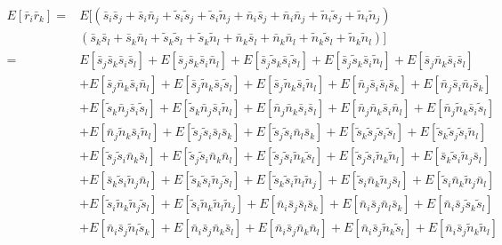 \begin{equation}
  \begin{split}
    E[\bar{r}_i\bar{r}_k] = &E[(\bar{s}_i\bar{s}_j + \bar{s}_i\bar{n}_j +\tilde{s}_i\tilde{s}_j+\tilde{s}_i\tilde{n}_j + \bar{n}_i\bar{s}_j+\bar{n}_i\bar{n}_j+\tilde{n}_i\tilde{s}_j+\tilde{n}_i\tilde{n}_j)\\
    &(\bar{s}_k\bar{s}_l + \bar{s}_k\bar{n}_l +\tilde{s}_k\tilde{s}_l+\tilde{s}_k\tilde{n}_l + \bar{n}_k\bar{s}_l+\bar{n}_k\bar{n}_l+\tilde{n}_k\tilde{s}_l+\tilde{n}_k\tilde{n}_l)]\\
    = &E[\bar{s}_j\bar{s}_k\bar{s}_i\bar{s}_l]+E[\bar{s}_j\bar{s}_k\bar{s}_i\bar{n}_l]+E[\bar{s}_j\tilde{s}_k\bar{s}_i\tilde{s}_l]+E[\bar{s}_j\tilde{s}_k\bar{s}_i\tilde{n}_l]+E[\bar{s}_j\bar{n}_k\bar{s}_i\bar{s}_l]\\
&+E[\bar{s}_j\bar{n}_k\bar{s}_i\bar{n}_l]+E[\bar{s}_j\tilde{n}_k\bar{s}_i\tilde{s}_l]+E[\bar{s}_j\tilde{n}_k\bar{s}_i\tilde{n}_l]+E[\bar{n}_j\bar{s}_i\bar{s}_l\bar{s}_k]+E[\bar{n}_j\bar{s}_i\bar{n}_l\bar{s}_k]\\
&+E[\tilde{s}_k\bar{n}_j\bar{s}_i\tilde{s}_l]+E[\tilde{s}_k\bar{n}_j\bar{s}_i\tilde{n}_l]+E[\bar{n}_j\bar{n}_k\bar{s}_i\bar{s}_l]+E[\bar{n}_j\bar{n}_k\bar{s}_i\bar{n}_l]+E[\bar{n}_j\tilde{n}_k\bar{s}_i\tilde{s}_l]\\
&+E[\bar{n}_j\tilde{n}_k\bar{s}_i\tilde{n}_l]+E[\tilde{s}_j\tilde{s}_i\bar{s}_l\bar{s}_k]+E[\tilde{s}_j\tilde{s}_i\bar{n}_l\bar{s}_k]+E[\tilde{s}_k\tilde{s}_j\tilde{s}_i\tilde{s}_l]+E[\tilde{s}_k\tilde{s}_j\tilde{s}_i\tilde{n}_l]\\
&+E[\tilde{s}_j\tilde{s}_i\bar{n}_k\bar{s}_l]+E[\tilde{s}_j\tilde{s}_i\bar{n}_k\bar{n}_l]+E[\tilde{s}_j\tilde{s}_i\tilde{n}_k\tilde{s}_l]+E[\tilde{s}_j\tilde{s}_i\tilde{n}_k\tilde{n}_l]+E[\bar{s}_k\tilde{s}_i\tilde{n}_j\bar{s}_l]\\
&+E[\bar{s}_k\tilde{s}_i\tilde{n}_j\bar{n}_l]+E[\tilde{s}_k\tilde{s}_i\tilde{n}_j\tilde{s}_l]+E[\tilde{s}_k\tilde{s}_i\tilde{n}_l\tilde{n}_j]+E[\tilde{s}_i\bar{n}_k\tilde{n}_j\bar{s}_l]+E[\tilde{s}_i\bar{n}_k\tilde{n}_j\bar{n}_l]\\
&+E[\tilde{s}_i\tilde{n}_k\tilde{n}_j\tilde{s}_l]+E[\tilde{s}_i\tilde{n}_k\tilde{n}_l\tilde{n}_j]+E[\bar{n}_i\bar{s}_j\bar{s}_l\bar{s}_k]+E[\bar{n}_i\bar{s}_j\bar{n}_l\bar{s}_k]+E[\bar{n}_i\bar{s}_j\tilde{s}_k\tilde{s}_l]\\
&+E[\bar{n}_i\bar{s}_j\tilde{n}_l\tilde{s}_k]+E[\bar{n}_i\bar{s}_j\bar{n}_k\bar{s}_l]+E[\bar{n}_i\bar{s}_j\bar{n}_k\bar{n}_l]+E[\bar{n}_i\bar{s}_j\tilde{n}_k\tilde{s}_l]+E[\bar{n}_i\bar{s}_j\tilde{n}_k\tilde{n}_l]\\

\end{split}
\end{equation}
